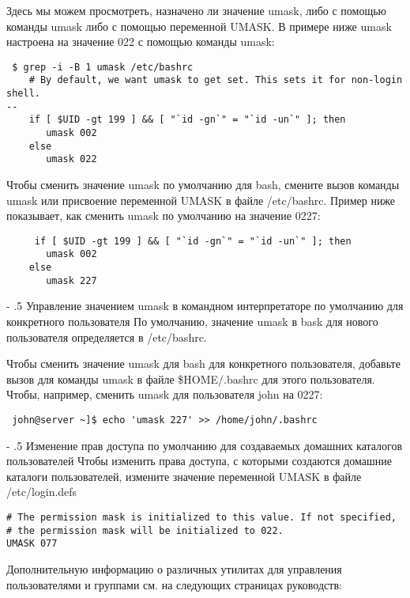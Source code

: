 \documentclass[a4paper,10pt,twoside]{article}
\makeatletter
\renewcommand\paragraph{%
   \@startsection{paragraph}{4}{0mm}%
      {-\baselineskip}%
      {.5\baselineskip}%
      {\normalfont\normalsize\bfseries}}
\makeatother
\begin{document}
Здесь мы можем просмотреть, назначено ли значение umask, либо с помощью  команды umask либо с помощью переменной UMASK. В примере ниже umask настроена на значение 022 с помощью команды umask:
\begin{verbatim}
 $ grep -i -B 1 umask /etc/bashrc
    # By default, we want umask to get set. This sets it for non-login shell.
--
    if [ $UID -gt 199 ] && [ "`id -gn`" = "`id -un`" ]; then
       umask 002
    else
       umask 022
\end{verbatim} 

Чтобы сменить значение umask по умолчанию для bash, смените вызов команды umask или присвоение переменной UMASK  в файле /etc/bashrc. Пример ниже показывает, как сменить umask по умолчанию на значение 0227:
\begin{verbatim}
     if [ $UID -gt 199 ] && [ "`id -gn`" = "`id -un`" ]; then
       umask 002
    else
       umask 227
\end{verbatim} 


\paragraph{Управление значением umask в командном интерпретаторе по умолчанию для конкретного пользователя}
По умолчанию, значение umask в bask для нового пользователя определяется в /etc/bashrc.

Чтобы сменить значение umask для bash для конкретного пользователя, добавьте вызов для команды umask в файле \$HOME/.bashrc для этого пользователя. Чтобы, например, сменить umask для пользователя john на 0227:

\begin{verbatim}
 john@server ~]$ echo 'umask 227' >> /home/john/.bashrc
\end{verbatim} 


\paragraph{Изменение прав доступа по умолчанию для создаваемых домашних каталогов пользователей}
Чтобы изменить права доступа, с которыми создаются домашние каталоги пользователей, измените значение переменной UMASK в файле /etc/login.defs
\begin{verbatim}
# The permission mask is initialized to this value. If not specified,
# the permission mask will be initialized to 022.
UMASK 077
\end{verbatim} 

Дополнительную информацию о различных утилитах для управления пользователями и группами см. на следующих страницах руководств:
\end{document}
